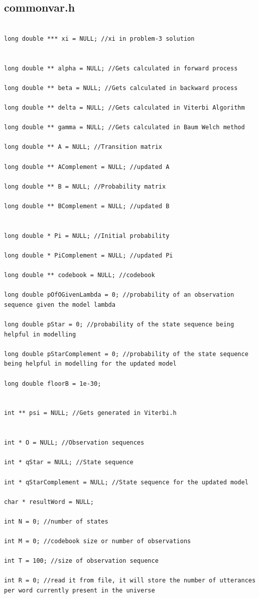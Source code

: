 \documentclass{article}
\begin{document}
\subsection{commonvar.h}
\begin{lstlisting}

long double *** xi = NULL; //xi in problem-3 solution


long double ** alpha = NULL; //Gets calculated in forward process

long double ** beta = NULL; //Gets calculated in backward process

long double ** delta = NULL; //Gets calculated in Viterbi Algorithm

long double ** gamma = NULL; //Gets calculated in Baum Welch method

long double ** A = NULL; //Transition matrix

long double ** AComplement = NULL; //updated A

long double ** B = NULL; //Probability matrix

long double ** BComplement = NULL; //updated B


long double * Pi = NULL; //Initial probability

long double * PiComplement = NULL; //updated Pi

long double ** codebook = NULL; //codebook

long double pOfOGivenLambda = 0; //probability of an observation sequence given the model lambda

long double pStar = 0; //probability of the state sequence being helpful in modelling

long double pStarComplement = 0; //probability of the state sequence being helpful in modelling for the updated model

long double floorB = 1e-30;


int ** psi = NULL; //Gets generated in Viterbi.h


int * O = NULL; //Observation sequences

int * qStar = NULL; //State sequence

int * qStarComplement = NULL; //State sequence for the updated model

char * resultWord = NULL;

int N = 0; //number of states

int M = 0; //codebook size or number of observations

int T = 100; //size of observation sequence

int R = 0; //read it from file, it will store the number of utterances per word currently present in the universe


\end{lstlisting}
\end{document}

